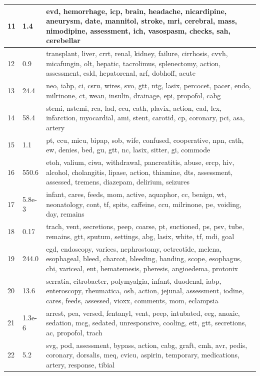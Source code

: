 \documentclass[journal]{IEEEtran}
\begin{document}
\begin{appendices}
\begin{center}
\begin{longtable}{| p{} | p{} | p{}|}
  11 & 1.4 & evd, hemorrhage, icp, brain, headache, nicardipine, aneurysm, date, mannitol, stroke, mri, cerebral, mass, nimodipine, assessment, ich, vasospasm, checks, sah, cerebellar \\ \hline
  12 & 0.9 & transplant, liver, crrt, renal, kidney, failure, cirrhosis, cvvh, micafungin, olt, hepatic, tacrolimus, splenectomy, action, assessment, esld, hepatorenal, arf, dobhoff, acute \\ \hline
  13 & 24.4 & neo, iabp, ci, csru, wires, svo, gtt, ntg, lasix, percocet, pacer, endo, milrinone, ct, wean, insulin, drainage, epi, propofol, cabg \\ \hline
  14 & 58.4 & stemi, nstemi, rca, lad, ccu, cath, plavix, action, cad, lcx, infarction, myocardial, ami, stent, carotid, cp, coronary, pci, asa, artery \\ \hline
  15 & 1.1 & pt, ccu, micu, bipap, sob, wife, confused, cooperative, npn, cath, ew, denies, bed, gu, gtt, nc, lasix, sitter, gi, commode \\ \hline
  16 & 550.6 & etoh, valium, ciwa, withdrawal, pancreatitis, abuse, ercp, hiv, alcohol, cholangitis, lipase, action, thiamine, dts, assessment, assessed, tremens, diazepam, delirium, seizures \\ \hline
  17 & 5.8e-3 & infant, cares, feeds, mom, active, aquaphor, cc, benign, wt, neonatology, cont, tf, spits, caffeine, ccu, milrinone, pe, voiding, day, remains \\ \hline
  18 & 0.17 & trach, vent, secretions, peep, coarse, pt, suctioned, ps, psv, tube, remains, gtt, sputum, settings, abg, lasix, white, tf, mdi, goal \\ \hline
  19 & 244.0 & egd, endoscopy, varices, nephrostomy, octreotide, melena, esophageal, bleed, charcot, bleeding, banding, scope, esophagus, cbi, variceal, ent, hematemesis, pheresis, angioedema, protonix \\ \hline
  20 & 13.6 & serratia, citrobacter, polymyalgia, infant, duodenal, iabp, enteroscopy, rheumatica, osh, action, jejunal, assessment, iodine, cares, feeds, assessed, vioxx, comments, mom, eclampsia \\ \hline
  21 & 1.3e-6 & arrest, pea, versed, fentanyl, vent, peep, intubated, eeg, anoxic, sedation, mcg, sedated, unresponsive, cooling, ett, gtt, secretions, ac, propofol, trach \\ \hline
  22 & 5.2 & svg, pod, assessment, bypass, action, cabg, graft, cmh, avr, pedis, coronary, dorsalis, meq, cvicu, aspirin, temporary, medications, artery, response, tibial \\ \hline

\end{longtable}
\end{center}
\end{appendices}
\end{document}
